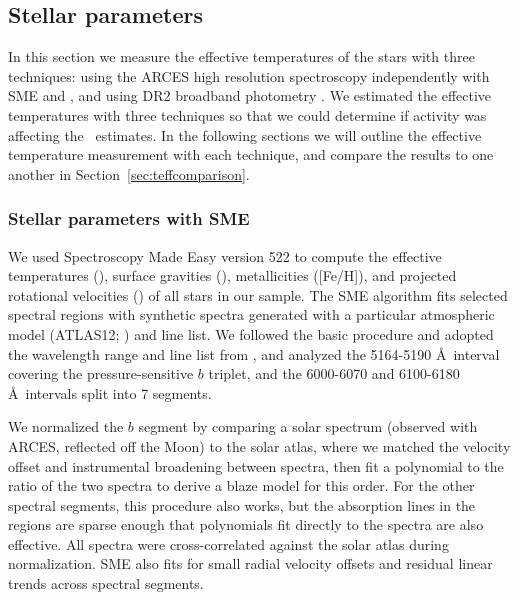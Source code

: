 \subsection{Stellar parameters}

In this section we measure the effective temperatures of the stars with three techniques: using the ARCES high resolution spectroscopy independently with SME and \moog, and using \gaia DR2 broadband photometry \citep{DR2prop}. We estimated the effective temperatures with three techniques so that we could determine if activity was affecting the \teff\ estimates. In the following sections we will outline the effective temperature measurement with each technique, and compare the results to one another in Section~\ref{sec:teffcomparison}.

\subsubsection{Stellar parameters with SME} \label{sec:sme}

We used Spectroscopy Made Easy \citep[SME;][]{sme, Valenti2005, Piskunov2017} version 522 to compute the effective temperatures (\teff), surface gravities (\logg),  metallicities ([Fe/H]), and projected rotational velocities (\vsini) of all stars in our sample. 
The SME algorithm fits selected spectral regions with synthetic spectra 
generated with a particular atmospheric model (ATLAS12; \citealt{atlas12}) and line list. 
We followed the basic procedure and adopted the wavelength range and line list from \citet{Valenti2005}, 
and analyzed the 5164-5190 \AA\ interval covering the pressure-sensitive  $b$ triplet, 
and the 6000-6070 and 6100-6180 \AA\ intervals split into 7 segments.


We normalized the  $b$ segment by comparing a solar spectrum (observed with ARCES, reflected off the Moon) 
to the \citet{Wallace2011} solar atlas, where we matched the velocity offset and instrumental broadening 
between spectra, then fit a polynomial to the ratio of the two spectra to derive a blaze model for this order.
For the other spectral segments, this procedure also works, but the absorption lines in the regions 
are sparse enough that polynomials fit directly to the spectra are also effective. 
All spectra were cross-correlated against the solar atlas during normalization. 
SME also fits for small radial velocity offsets and residual linear trends across spectral segments. 


